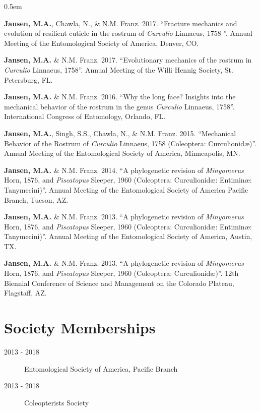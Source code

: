 \documentclass[12pt,a4paper]{article}
\begin{document}
	\begin{description}
		\itemsep0.5em
		\item \textbf{Jansen, M.A.}, Chawla, N., \& N.M. Franz. 2017. ``Fracture mechanics and evolution of resilient cuticle in the rostrum of \textit{Curculio} Linnaeus, 1758 ''. Annual Meeting of the Entomological Society of America, Denver, CO.
		\item \textbf{Jansen, M.A.} \& N.M. Franz. 2017. ``Evolutionary mechanics of the rostrum in \textit{Curculio} Linnaeus, 1758''. Annual Meeting of the Willi Hennig Society, St. Petersburg, FL.
		\item \textbf{Jansen, M.A.} \& N.M. Franz. 2016. ``Why the long face? Insights into the mechanical behavior of the rostrum in the genus \textit{Curculio} Linnaeus, 1758''. International Congress of Entomology, Orlando, FL.
		\item \textbf{Jansen, M.A.}, Singh, S.S., Chawla, N., \& N.M. Franz. 2015. ``Mechanical Behavior of the Rostrum of \textit{Curculio} Linnaeus, 1758 (Coleoptera: Curculionid\ae)''. Annual Meeting of the Entomological Society of America, Minneapolis, MN.
		\item \textbf{Jansen, M.A.} \& N.M. Franz. 2014. ``A phylogenetic revision of \textit{Minyomerus} Horn, 1876, and \textit{Piscatopus} Sleeper, 1960 (Coleoptera: Curculionid\ae: Entimin\ae: Tanymecini)''. Annual Meeting of the Entomological Society of America Pacific Branch, Tucson, AZ.
		\item \textbf{Jansen, M.A.} \& N.M. Franz. 2013. ``A phylogenetic revision of \textit{Minyomerus} Horn, 1876, and \textit{Piscatopus} Sleeper, 1960 (Coleoptera: Curculionid\ae: Entimin\ae: Tanymecini)''. Annual Meeting of the Entomological Society of America, Austin, TX.
		\item \textbf{Jansen, M.A.} \& N.M. Franz. 2013. ``A phylogenetic revision of \textit{Minyomerus} Horn, 1876, and \textit{Piscatopus} Sleeper, 1960 (Coleoptera: Curculionid\ae)''. 12th Biennial Conference of Science and Management on the Colorado Plateau, Flagstaff, AZ.
	\end{description}

\section*{Society Memberships}

	\begin{description}
		\item [2013 - 2018] Entomological Society of America, Pacific Branch
		\item [2013 - 2018] Coleopterists Society
	\end{description}
\end{document}
